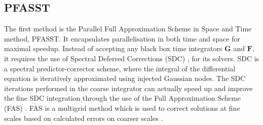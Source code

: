 \subsection{PFASST}
\label{subsec: intro pfasst}
The first method is the Parallel Full Approximation Scheme in Space and Time \cite{emmett_toward_2012} method, PFASST. It encapsulates parallelisation in both time and space for maximal speedup. Instead of accepting any black box time integrators $\textbf{G}$ and $\textbf{F}$, it requires the use of Spectral Deferred Corrections (SDC) \cite{dutt_spectral_2000}, for its solvers. SDC is a spectral predictor-corrector scheme, where the integral of the differential equation is iteratively approximated using injected Gaussian nodes. The SDC iterations performed in the coarse integrator can actually speed up and improve the fine SDC integration through the use of the Full Approximation Scheme (FAS) \cite{brandt_multi-level_1976}. FAS is a multigrid method which is used to correct solutions at fine scales based on calculated errors on coarser scales \cite{henson_multigrid_2003}.


